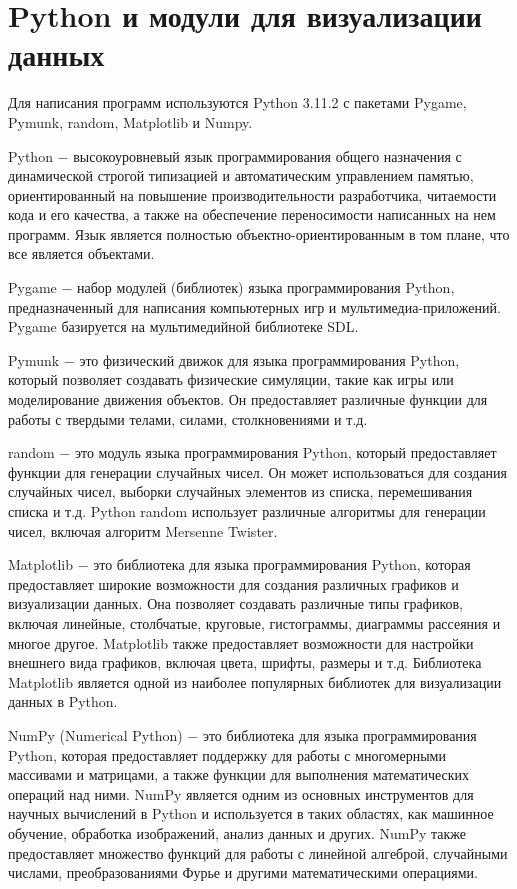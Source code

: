 \section{Python и модули для визуализации данных}

Для написания программ используются Python 3.11.2 с пакетами Pygame, Pymunk, random, Matplotlib и Numpy.

Python $-$ высокоуровневый язык программирования общего назначения с динамической строгой типизацией и автоматическим управлением памятью, ориентированный на повышение производительности разработчика, читаемости кода и его качества, а также на обеспечение переносимости написанных на нем программ. Язык является полностью объектно-ориентированным в том плане, что все является объектами. \cite{PYD}

Pygame $-$ набор модулей (библиотек) языка программирования Python, предназначенный для написания компьютерных игр и мультимедиа-приложений. Pygame базируется на мультимедийной библиотеке SDL. \cite{PYGD}

Pymunk $-$ это физический движок для языка программирования Python, который позволяет создавать физические симуляции, такие как игры или моделирование движения объектов. Он предоставляет различные функции для работы с твердыми телами, силами, столкновениями и т.д. \cite{PYMD}

random $-$ это модуль языка программирования Python, который предоставляет функции для генерации случайных чисел. Он может использоваться для создания случайных чисел, выборки случайных элементов из списка, перемешивания списка и т.д. Python random использует различные алгоритмы для генерации чисел, включая алгоритм Mersenne Twister. \cite{PYD}

Matplotlib $-$ это библиотека для языка программирования Python, которая предоставляет широкие возможности для создания различных графиков и визуализации данных. Она позволяет создавать различные типы графиков, включая линейные, столбчатые, круговые, гистограммы, диаграммы рассеяния и многое другое. Matplotlib также предоставляет возможности для настройки внешнего вида графиков, включая цвета, шрифты, размеры и т.д. Библиотека Matplotlib является одной из наиболее популярных библиотек для визуализации данных в Python. \cite{PLOTD}

NumPy (Numerical Python) $-$ это библиотека для языка программирования Python, которая предоставляет поддержку для работы с многомерными массивами и матрицами, а также функции для выполнения математических операций над ними. NumPy является одним из основных инструментов для научных вычислений в Python и используется в таких областях, как машинное обучение, обработка изображений, анализ данных и других. NumPy также предоставляет множество функций для работы с линейной алгеброй, случайными числами, преобразованиями Фурье и другими математическими операциями. \cite{NUMD}
